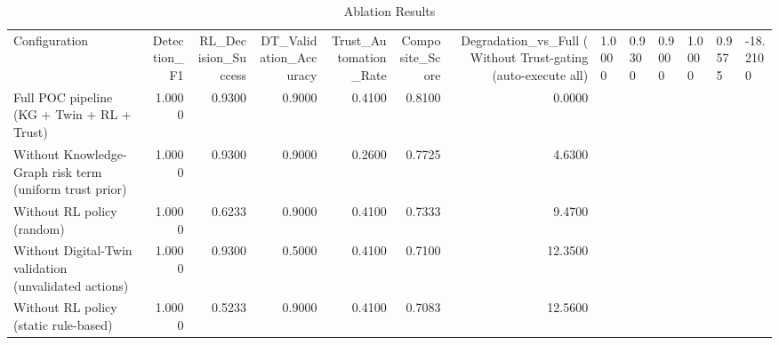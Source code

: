 \begin{table}
\caption{Ablation Results}
\label{tab:ablation_results}
\begin{tabular}{lrrrrrr}
\toprule
Configuration & Detection_F1 & RL_Decision_Success & DT_Validation_Accuracy & Trust_Automation_Rate & Composite_Score & Degradation_vs_Full (%
\midrule
Without Trust-gating (auto-execute all) & 1.0000 & 0.9300 & 0.9000 & 1.0000 & 0.9575 & -18.2100 \\
Full POC pipeline (KG + Twin + RL + Trust) & 1.0000 & 0.9300 & 0.9000 & 0.4100 & 0.8100 & 0.0000 \\
Without Knowledge-Graph risk term (uniform trust prior) & 1.0000 & 0.9300 & 0.9000 & 0.2600 & 0.7725 & 4.6300 \\
Without RL policy (random) & 1.0000 & 0.6233 & 0.9000 & 0.4100 & 0.7333 & 9.4700 \\
Without Digital-Twin validation (unvalidated actions) & 1.0000 & 0.9300 & 0.5000 & 0.4100 & 0.7100 & 12.3500 \\
Without RL policy (static rule-based) & 1.0000 & 0.5233 & 0.9000 & 0.4100 & 0.7083 & 12.5600 \\
\bottomrule
\end{tabular}
\end{table}
